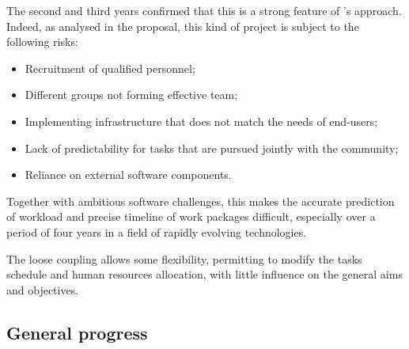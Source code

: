 \documentclass{deliverablereport}
\begin{document}
The second and third years confirmed that this is a strong feature of \ODK's
approach. Indeed, as analysed in the proposal, this kind of project is
subject to the following risks:
\begin{itemize}
\item Recruitment of qualified personnel;
\item Different groups not forming effective team;
\item Implementing infrastructure that does not match the needs of end-users;
\item Lack of predictability for tasks that are pursued jointly with
  the community;
\item Reliance on external software components.
\end{itemize}
Together with ambitious software challenges, this makes the accurate
prediction of workload and precise timeline of work packages
difficult, especially over a period of four years in a field of
rapidly evolving technologies.

The loose coupling allows some flexibility,
permitting to modify the tasks schedule and human resources allocation,
with little influence on the general aims and objectives.

\subsection{General progress}
\end{document}
